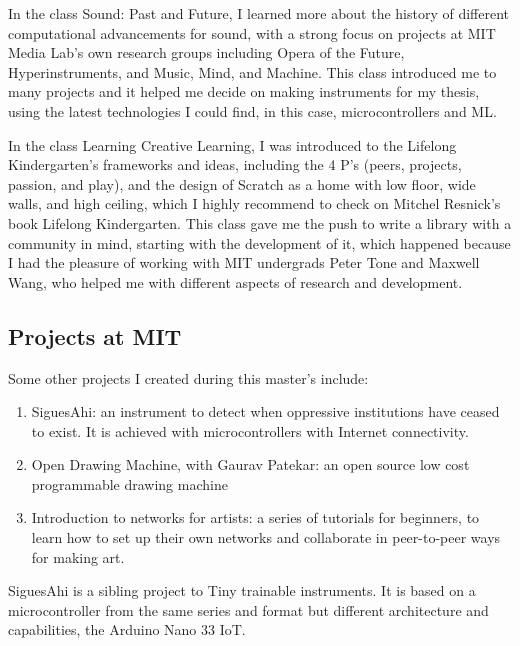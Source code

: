 In the class Sound: Past and Future, I learned more about the history of different computational advancements for sound, with a strong focus on projects at MIT Media Lab's own research groups including Opera of the Future, Hyperinstruments, and Music, Mind, and Machine. This class introduced me to many projects and it helped me decide on making instruments for my thesis, using the latest technologies I could find, in this case, microcontrollers and \acrshort{ML}.

In the class Learning Creative Learning, I was introduced to the Lifelong Kindergarten's frameworks and ideas, including the 4 P's (peers, projects, passion, and play), and the design of Scratch as a home with low floor, wide walls, and high ceiling, which I highly recommend to check on Mitchel Resnick's book Lifelong Kindergarten. This class gave me the push to write a library with a community in mind, starting with the development of it, which happened because I had the pleasure of working with MIT undergrads Peter Tone and Maxwell Wang, who helped me with different aspects of research and development.

\subsection{Projects at MIT}

Some other projects I created during this master's include:

\begin{enumerate}
  \item SiguesAhi: an instrument to detect when oppressive institutions have ceased to exist. It is achieved with microcontrollers with Internet connectivity.
  \item Open Drawing Machine, with Gaurav Patekar: an open source low cost programmable drawing machine
  \item Introduction to networks for artists: a series of tutorials for beginners, to learn how to set up their own networks and collaborate in peer-to-peer ways for making art.
\end{enumerate}

SiguesAhi is a sibling project to Tiny trainable instruments. It is based on a microcontroller from the same series and format but different architecture and capabilities, the Arduino Nano 33 IoT.

